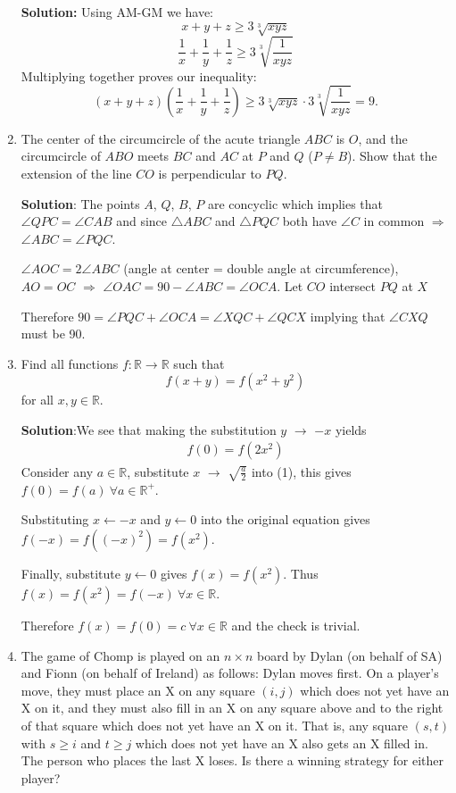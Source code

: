 \documentclass{article}
\begin{document}
\begin{enumerate}[itemsep=24pt]
\textbf{Solution:} 
Using AM-GM we have:
$$x+y+z \geq 3\sqrt[3]{xyz}$$
$$\frac{1}{x}+\frac{1}{y}+\frac{1}{z} \geq 3\sqrt[3]{\frac{1}{xyz}}$$
Multiplying together proves our inequality:
$$(x+y+z)\left(\frac{1}{x}+\frac{1}{y}+\frac{1}{z}\right) \geq 3\sqrt[3]{xyz}\cdot 3\sqrt[3]{\frac{1}{xyz}} = 9.$$

\item
The center of the circumcircle of the acute triangle $ABC$ is $O$, and the circumcircle of $ABO$ meets $BC$ and $AC$ at $P$ and $Q$ ($P\neq B$).
Show that the extension of the line $CO$ is perpendicular to $PQ$.

\textbf{Solution}:
The points $A$, $Q$, $B$, $P$ are concyclic which implies that $\angle{QPC} = \angle{CAB}$ and since $\triangle{ABC}$ and $\triangle{PQC}$ both have $\angle{C}$ in common $\Rightarrow$ $\angle{ABC}=\angle{PQC}$.

$\angle{AOC} = 2\angle{ABC}$ (angle at center = double angle at circumference), $AO = OC$ $\Rightarrow$ $\angle{OAC} = 90 - \angle{ABC} = \angle{OCA}$. Let $CO$ intersect $PQ$ at $X$

Therefore $90 = \angle{PQC} + \angle{OCA} = \angle{XQC} + \angle{QCX}$ implying that $\angle{CXQ}$ must be 90.

\item
Find all functions $f : \mathbb{R} \to \mathbb{R}$ such that \[ f(x+y) = f(x^2+y^2) \] for all $x,y \in \mathbb{R}$.

\textbf{Solution}:We see that making the substitution $y$ $\rightarrow$ $-x$ yields 
\begin{align}
    f(0)=f(2x^{2})
\end{align}
Consider any $a \in \mathbb{R}$, substitute $x$ $\rightarrow$ $\sqrt{\frac{a}{2}}$ into (1), this gives $f(0) = f(a) \ \forall a \in \mathbb{R^{+}}$.

Substituting $x \leftarrow -x$ and $y \leftarrow 0$ into the original equation gives $f(-x) = f((-x)^{2}) = f(x^{2})$.

Finally, substitute $y \leftarrow 0$ gives $f(x) = f(x^{2})$. Thus $f(x)= f(x^{2}) = f(-x) \ \forall x \in \mathbb{R}$.

Therefore $f(x) = f(0) = c \ \forall x \in \mathbb{R}$ and the check is trivial.

\item %
The game of Chomp is played on an $n \times n$ board by Dylan (on behalf of SA) and Fionn (on behalf of Ireland) as follows: Dylan moves first.
On a player's move, they must place an X on any square $(i, j)$ which does not yet have an X on it, and they must also fill in an X on any square above and to the right of that square which does not yet have an X on it.
That is, any square $(s, t)$ with $s \geq i$ and $t \geq j$ which does not yet have an X also gets an X filled in.
The person who places the last X loses.
Is there a winning strategy for either player?


\end{enumerate}
\end{document}
